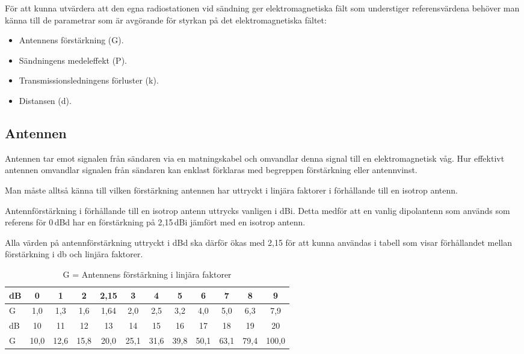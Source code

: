 För att kunna utvärdera att den egna radiostationen vid sändning ger
elektromagnetiska fält som understiger referensvärdena behöver man känna till
de parametrar som är avgörande för styrkan på det elektromagnetiska fältet:

\begin{itemize}
  \item Antennens förstärkning (G).
  \item Sändningens medeleffekt (P).
  \item Transmissionsledningens förluster (k).
  \item Distansen (d).
\end{itemize}

\subsection{Antennen}
Antennen tar emot signalen från sändaren via en matningskabel och
omvandlar denna signal till en elektromagnetisk våg.
Hur effektivt antennen omvandlar signalen från sändaren kan enklast förklaras
med begreppen förstärkning eller antennvinst.

Man måste alltså känna till vilken förstärkning antennen har uttryckt i linjära
faktorer i förhållande till en isotrop antenn.

Antennförstärkning i förhållande till en isotrop antenn uttrycks vanligen i dBi.
Detta medför att en vanlig dipolantenn som används som referens för 0\,dBd har
en förstärkning på 2,15\,dBi jämfört med en isotrop antenn.

Alla värden på antennförstärkning uttryckt i dBd ska därför ökas med 2,15 för
att kunna användas i tabell  som visar förhållandet mellan
förstärkning i \unit{\decibel} och linjära faktorer.

\begin{table*}[ht]
  \begin{center}
    \begin{tabular}{|l|ccccccccccc|}
	\hline
	dB     &  0  &  1  &  2 & 2,15 &  3  &  4  &  5  &  6  &  7  &  8  &  9  \\ \hline
	G & 1,0 & 1,3 & 1,6 & 1,64 & 2,0 & 2,5 & 3,2 & 4,0 & 5,0 & 6,3 & 7,9 \\ \hline
	dB     &  10  &  11  &  12  &  13  &  14  &  15  &  16  &  17  &  18  &  19  &  20 \\ \hline
	G & 10,0 & 12,6 & 15,8 & 20,0 & 25,1 & 31,6 & 39,8 & 50,1 & 63,1 & 79,4 & 100,0 \\ \hline
    \end{tabular}
    \caption{G = Antennens förstärkning i linjära faktorer}
    \label{tab:forst}
  \end{center}
\end{table*}

